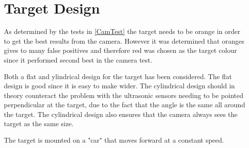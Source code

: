 \section{Target Design}
As determined by the tests in \autoref{CamTest} the target needs to be orange in
order to get the best results from the camera. However it was determined that
oranges gives to many false positives and therefore red was chosen as the target
colour since it performed second best in the camera test.\nl

Both a flat and ylindrical design for the target has been considered. The flat
design is good since it is easy to make wider. The cylindrical design
should in theory counteract the problem with the ultrasonic sensors needing to be pointed
perpendicular at the target, due to the fact that the angle is the same all
around the target. The cylindrical design also ensures that the camera always
sees the target as the same size.\nl

The target is mounted on a "car" that moves forward at a constant speed. 





